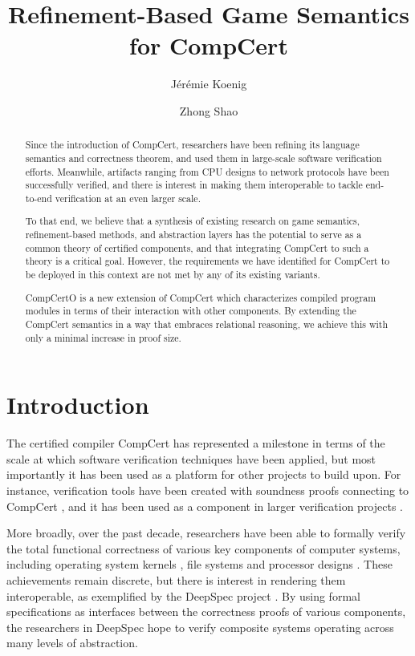 \documentclass[sigplan,10pt,review,anonymous]{acmart}
\title{Refinement-Based Game Semantics for CompCert} %
\author{J\'er\'emie Koenig}
\affiliation{Yale University}
\author{Zhong Shao}
\affiliation{Yale University}
\begin{document}
\begin{abstract} %
Since the introduction of CompCert,
researchers have been refining
its language semantics and correctness theorem,
and used them in
large-scale software verification efforts.
Meanwhile,
artifacts ranging from CPU designs to network protocols
have been successfully verified,
and there is interest in
making them interoperable
to tackle end-to-end verification
at an even larger scale.

To that end,
we believe that
a synthesis of existing research on
game semantics,
refinement-based methods, and
abstraction layers
has the potential to serve as a common theory
of certified components,
and that integrating CompCert to such a theory
is a critical goal.
However,
the requirements we have identified for
CompCert to be deployed in this context
are not met by any of its existing variants.

CompCertO is
a new extension of CompCert
which characterizes compiled program modules
in terms of their interaction with other components.
By extending the CompCert semantics
in a way that embraces relational reasoning,
we achieve this with only a minimal increase
in proof size.
\end{abstract}

\maketitle

\section{Introduction} %


The certified compiler CompCert \cite{compcert}
has represented a milestone
in terms of the scale at which software verification techniques
have been applied,
but most importantly
it has been used as a platform for other projects to build upon.
For instance,
verification tools have been created with soundness proofs
connecting to CompCert \cite{vst,verasco},
and it has been used as a component
in larger verification projects \cite{popl15}.

More broadly, over the past decade,
researchers have been able to formally verify the
total functional correctness
of various key components of computer systems,
including
operating system kernels \cite{sel4, popl15},
file systems \cite{fscq} and
processor designs \cite{safe}.
These achievements remain discrete, but
there is interest in rendering them interoperable,
as exemplified by the DeepSpec project \cite{deepspec}.
By using formal specifications as interfaces
between the correctness proofs of various components, %
the researchers in DeepSpec hope to
verify composite systems
operating across many levels of abstraction.
\end{document}
